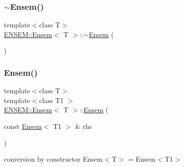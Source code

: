 \mbox{\label{classENSEM_1_1Ensem_a01e4e19b101048ad2ffcf886017592c9}} 
\subsubsection{\texorpdfstring{$\sim$Ensem()}{~Ensem()}\hspace{0.1cm}{\footnotesize\ttfamily [1/2]}}
{\footnotesize\ttfamily template$<$class T$>$ \\
\mbox{\hyperlink{classENSEM_1_1Ensem}{E\+N\+S\+E\+M\+::\+Ensem}}$<$ T $>$\+::$\sim$\mbox{\hyperlink{classENSEM_1_1Ensem}{Ensem}} (\begin{DoxyParamCaption}{ }\end{DoxyParamCaption})\hspace{0.3cm}{\ttfamily [inline]}}

\mbox{\label{classENSEM_1_1Ensem_ab0e04ebf09af997fb7f1477cdc48145b}} 
\subsubsection{\texorpdfstring{Ensem()}{Ensem()}\hspace{0.1cm}{\footnotesize\ttfamily [2/6]}}
{\footnotesize\ttfamily template$<$class T$>$ \\
template$<$class T1 $>$ \\
\mbox{\hyperlink{classENSEM_1_1Ensem}{E\+N\+S\+E\+M\+::\+Ensem}}$<$ T $>$\+::\mbox{\hyperlink{classENSEM_1_1Ensem}{Ensem}} (\begin{DoxyParamCaption}\item[{const \mbox{\hyperlink{classENSEM_1_1Ensem}{Ensem}}$<$ T1 $>$ \&}]{rhs }\end{DoxyParamCaption})\hspace{0.3cm}{\ttfamily [inline]}}



conversion by constructor Ensem$<$\+T$>$ = Ensem$<$\+T1$>$ 


